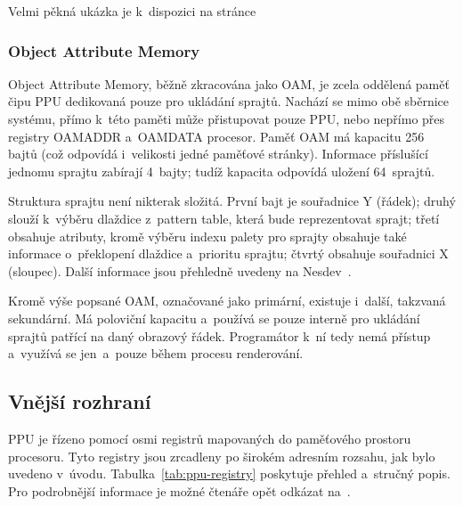 Velmi pěkná ukázka je k~dispozici na stránce~\cite{Nesdev:attribute-table}

\subsubsection{Object Attribute Memory}
\label{sec:ppu-oam}
Object Attribute Memory, běžně zkracována jako OAM, je zcela oddělená paměť čipu PPU dedikovaná pouze pro ukládání sprajtů. Nachází se mimo obě sběrnice systému, přímo k~této paměti může přistupovat pouze PPU, nebo nepřímo přes registry OAMADDR a~OAMDATA procesor. Paměť OAM má kapacitu 256 bajtů (což odpovídá i~velikosti jedné paměťové stránky). Informace příslušící jednomu sprajtu zabírají 4~bajty; tudíž kapacita odpovídá uložení 64~sprajtů.

Struktura sprajtu není nikterak složitá. První bajt je souřadnice Y (řádek); druhý slouží k~výběru dlaždice z~pattern table, která bude reprezentovat sprajt; třetí obsahuje atributy, kromě výběru indexu palety pro sprajty obsahuje také informace o~překlopení dlaždice a~prioritu sprajtu; čtvrtý obsahuje souřadnici X (sloupec). Další informace jsou přehledně uvedeny na Nesdev~\cite{Nesdev:oam}.

\begin{note}
	Kromě výše popsané OAM, označované jako primární, existuje i~další, takzvaná sekundární. Má poloviční kapacitu a~používá se pouze interně pro ukládání sprajtů patřící na daný obrazový řádek. Programátor k~ní tedy nemá přístup a~využívá se jen~a~pouze během procesu renderování.
\end{note}

\subsection{Vnější rozhraní}
\label{sec:ppu-cpu-io}
PPU je řízeno pomocí osmi registrů mapovaných do paměťového prostoru procesoru. Tyto registry jsou zrcadleny po širokém adresním rozsahu, jak bylo uvedeno v~úvodu. Tabulka~\ref{tab:ppu-registry} poskytuje přehled a~stručný popis. Pro podrobnější informace je možné čtenáře opět odkázat na~\cite{Nesdev:ppu-registers}.

